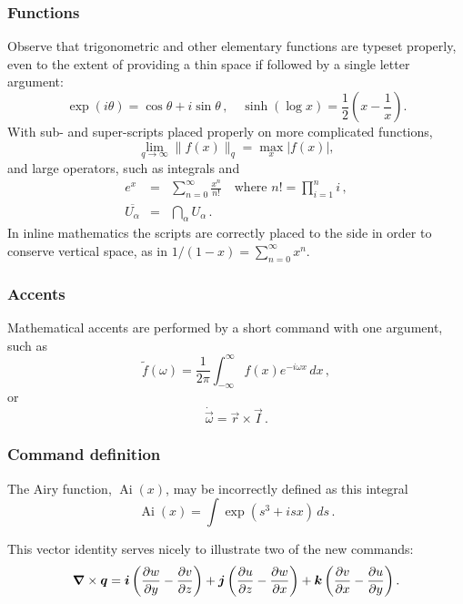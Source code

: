 \subsubsection{Functions}

Observe that trigonometric and other elementary functions are typeset 
properly, even to the extent of providing a thin space if followed by 
a single letter argument:
\[
\exp(i\theta)=\cos\theta +i\sin\theta\,,\quad
\sinh(\log x)=\frac{1}{2}\left( x-\frac{1}{x} \right).
\]
With sub- and super-scripts placed properly on more complicated 
functions,
\[
\lim_{q\to\infty}\|f(x)\|_q 
=\max_{x}|f(x)|,
\]
and large operators, such as integrals and
\begin{eqnarray*}
	e^x & = & \sum_{n=0}^\infty \frac{x^n}{n!}
	\quad\text{where }n!=\prod_{i=1}^n i\,,  \\
	\overline{U_\alpha} & = & \bigcap_\alpha U_\alpha\,.
\end{eqnarray*}
In inline mathematics the scripts are correctly placed to the side in 
order to conserve vertical space, as in
\(
1/(1-x)=\sum_{n=0}^\infty x^n.
\)






\subsubsection{Accents}

Mathematical accents are performed by a short command with one 
argument, such as
\[
\tilde f(\omega)=\frac{1}{2\pi}
\int_{-\infty}^\infty f(x)e^{-i\omega x}\,dx\,,
\]
or
\[
\dot{\vec \omega}=\vec r\times\vec I\,.
\]





\subsubsection{Command definition}

\newcommand{\Ai}{\operatorname{Ai}} 
The Airy function, $\Ai(x)$, may be incorrectly defined as this 
integral
\[
\Ai(x)=\int\exp(s^3+isx)\,ds\,.
\]

\newcommand{\D}[2]{\frac{\partial #2}{\partial #1}}
\newcommand{\DD}[2]{\frac{\partial^2 #2}{\partial #1^2}}
\renewcommand{\vec}[1]{\text{\boldmath$#1$}}

This vector identity serves nicely to illustrate two of the new 
commands:
\[
\vec\nabla\times\vec q
=\vec i\left(\D yw-\D zv\right)
+\vec j\left(\D zu-\D xw\right)
+\vec k\left(\D xv-\D yu\right).
\]




